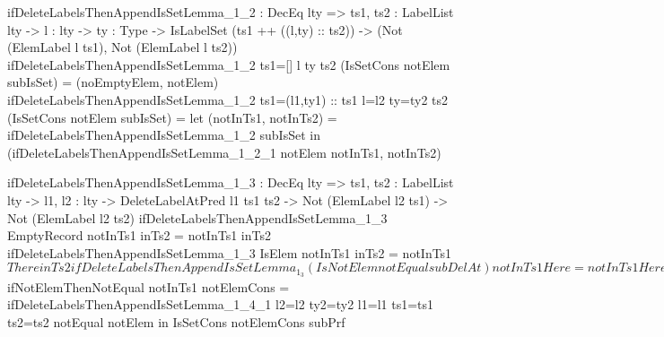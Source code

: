 \begin{code}
ifDeleteLabelsThenAppendIsSetLemma_1_2 : DecEq lty => 
  {ts1, ts2 : LabelList lty} -> {l : lty} -> {ty : Type} ->
  IsLabelSet (ts1 ++ ((l,ty) :: ts2)) -> 
  (Not (ElemLabel l ts1), Not (ElemLabel l ts2))  
ifDeleteLabelsThenAppendIsSetLemma_1_2 {ts1=[]} {l} {ty} {ts2} 
  (IsSetCons notElem subIsSet) = (noEmptyElem, notElem)
ifDeleteLabelsThenAppendIsSetLemma_1_2 {ts1=(l1,ty1) :: ts1} 
  {l=l2} {ty=ty2} {ts2} (IsSetCons notElem subIsSet) = 
  let (notInTs1, notInTs2) = 
        ifDeleteLabelsThenAppendIsSetLemma_1_2 subIsSet
  in (ifDeleteLabelsThenAppendIsSetLemma_1_2_1 notElem notInTs1, 
        notInTs2)

ifDeleteLabelsThenAppendIsSetLemma_1_3 : DecEq lty => 
  {ts1, ts2 : LabelList lty} -> {l1, l2 : lty} ->
  DeleteLabelAtPred l1 ts1 ts2 -> Not (ElemLabel l2 ts1) -> 
  Not (ElemLabel l2 ts2)
ifDeleteLabelsThenAppendIsSetLemma_1_3 EmptyRecord notInTs1 inTs2 = 
  notInTs1 inTs2
ifDeleteLabelsThenAppendIsSetLemma_1_3 IsElem notInTs1 inTs2 = 
  notInTs1 $ There inTs2
ifDeleteLabelsThenAppendIsSetLemma_1_3 (IsNotElem notEqual 
  subDelAt) notInTs1 Here = notInTs1 Here
ifDeleteLabelsThenAppendIsSetLemma_1_3 {l1} {l2} 
  {ts1=((l3,ty3) :: ts1)} {ts2=((l3,ty3) :: ts2)} 
  (IsNotElem notEqual subDelAt) notInTs1 (There inTs2) =
  let subPrf = 
        ifDeleteLabelsThenAppendIsSetLemma_1_3 {l1=l1} {ts1=ts1} 
          {ts2=ts2} subDelAt (notElemInCons notInTs1)
  in subPrf inTs2

ifDeleteLabelsThenAppendIsSetLemma_1_4_1 : DecEq lty => 
  {ts1, ts2 : LabelList lty} -> {l1, l2 : lty} -> {ty2 : Type} ->
  Not (l1 = l2) -> Not (ElemLabel l1 (ts1 ++ ts2)) -> 
  Not (ElemLabel l1 (ts1 ++ ((l2,ty2) :: ts2)))
ifDeleteLabelsThenAppendIsSetLemma_1_4_1 {ts1=[]} notEqual 
  notInAppend Here = notEqual Refl
ifDeleteLabelsThenAppendIsSetLemma_1_4_1 {ts1=[]} notEqual 
  notInAppend (There isThere) = notInAppend isThere
ifDeleteLabelsThenAppendIsSetLemma_1_4_1 {l1} {l2} 
  {ts1=(l1,ty3) :: ts1} notEqual notInAppend Here = 
  notInAppend Here
ifDeleteLabelsThenAppendIsSetLemma_1_4_1 {l1} {l2} 
  {ts1=(l3,ty3) :: ts1} {ts2=ts2} {ty2=ty2} notEqual 
  notInAppend (There isThere) = 
  let subPrf = 
        ifDeleteLabelsThenAppendIsSetLemma_1_4_1 {l1=l1} 
          {l2=l2} {ts1=ts1} {ts2=ts2} {ty2=ty2} notEqual 
          (notElemInCons notInAppend)
  in subPrf isThere

ifDeleteLabelsThenAppendIsSetLemma_1_4 : DecEq lty => 
  {ts1, ts2 : LabelList lty} -> {l : lty} -> {ty : Type} ->
  IsLabelSet (ts1 ++ ts2) -> Not (ElemLabel l ts1) -> 
  Not (ElemLabel l ts2) -> IsLabelSet (ts1 ++ ((l,ty) :: ts2))
ifDeleteLabelsThenAppendIsSetLemma_1_4 {ts1=[]} isSet notInTs1 
  notInTs2 = IsSetCons notInTs2 isSet
ifDeleteLabelsThenAppendIsSetLemma_1_4 {l=l2} {ty=ty2} 
  {ts1=(l1,ty1) :: ts1} {ts2} (IsSetCons notElem isSet) notInTs1 
  notInTs2 = 
  let subPrf = 
        ifDeleteLabelsThenAppendIsSetLemma_1_4 {l=l2} {ty=ty2} 
          isSet (notElemInCons notInTs1) notInTs2
      notEqual = symNot $ ifNotElemThenNotEqual notInTs1
      notElemCons = 
        ifDeleteLabelsThenAppendIsSetLemma_1_4_1 {l2=l2} {ty2=ty2} 
          {l1=l1} {ts1=ts1} {ts2=ts2} notEqual notElem
  in IsSetCons notElemCons subPrf


\end{code}
